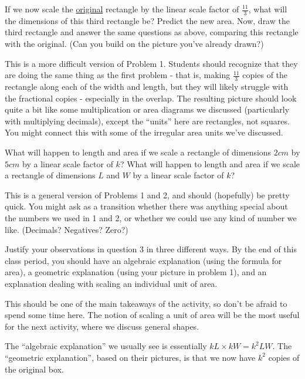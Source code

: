 \documentclass[nooutcomes]{ximera}
\begin{document}
\begin{problem}
If we now scale the \underline{original} rectangle by the linear scale factor of $\frac{11}{3}$, what will the dimensions of this third rectangle be?  Predict the new area.  Now, draw the third rectangle and answer the same questions as above, comparing this rectangle with the original. (Can you build on the picture you've already drawn?)

\begin{instructorNotes}
This is a more difficult version of Problem 1.  Students should recognize that they are doing the same thing as the first problem - that is, making $\frac{11}{3}$ copies of the rectangle along each of the width and length, but they will likely struggle with the fractional copies - especially in the overlap.  The resulting picture should look quite a bit like some multiplication or area diagrams we discussed (particularly with multiplying decimals), except the ``units'' here are rectangles, not squares.  You might connect this with some of the irregular area units we've discussed.
\end{instructorNotes}

\end{problem}


\begin{problem}
What will happen to length and area if we scale a rectangle of dimensions $2 cm$ by $5 cm$ by a linear scale factor of $k$? What will happen to length and area if we scale a rectangle of dimensions $L$ and $W$ by a linear scale factor of $k$?

\begin{instructorNotes}
This is a general version of Problems 1 and 2, and should (hopefully) be pretty quick.  You might ask as a transition whether there was anything special about the numbers we used in 1 and 2, or whether we could use any kind of number we like.  (Decimals?  Negatives?  Zero?)
\end{instructorNotes}
\end{problem}

\begin{problem}
Justify your observations in question 3 in three different ways.  By the end of this class period, you should have an algebraic explanation (using the formula for area), a geometric explanation (using your picture in problem 1), and an explanation dealing with scaling an individual unit of area.
\begin{instructorNotes}
This should be one of the main takeaways of the activity, so don't be afraid to spend some time here.  The notion of scaling a unit of area will be the most useful for the next activity, where we discuss general shapes.  

The ``algebraic explanation'' we usually see is essentially $k L \times k W = k^2 LW$.  The ``geometric explanation'', based on their pictures, is that we now have $k^2$ copies of the original box.
\end{instructorNotes}
\end{problem}
\end{document}
